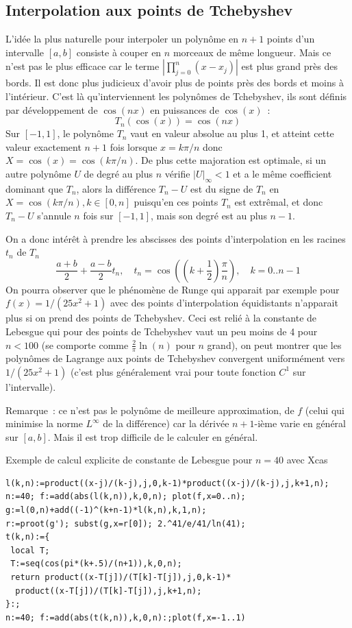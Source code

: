 \documentclass[a4paper,11pt]{article}
\begin{document}
\subsection{Interpolation aux points de Tchebyshev}
L'id\'ee la plus naturelle pour interpoler un polyn\^ome en $n+1$
points d'un intervalle $[a,b]$ consiste \`a couper en $n$ morceaux
de m\^eme longueur. Mais ce n'est pas le plus efficace car le
terme $|\prod_{j=0}^n(x-x_j)|$ est plus grand pr\`es des bords. Il est
donc plus judicieux d'avoir plus de points pr\`es des bords et moins
\`a l'int\'erieur. C'est l\`a qu'interviennent les polyn\^omes de
Tchebyshev, ils sont d\'efinis par d\'eveloppement de $\cos(nx)$
en puissances de $\cos(x)$~:
$$ T_n(\cos(x))=\cos(nx) $$
Sur $[-1,1]$, le polyn\^ome $T_n$ vaut en valeur absolue au plus 1, et
atteint cette valeur exactement $n+1$ fois lorsque $x=k\pi/n$ donc 
$X=\cos(x)=\cos(k\pi/n)$. De plus cette majoration est optimale,
si un autre polyn\^ome $U$ de degr\'e au plus $n$ 
v\'erifie $|U|_\infty<1$ et a le m\^eme coefficient dominant que
$T_n$, alors la diff\'erence $T_n-U$ est du signe de $T_n$ en
$X=\cos(k\pi/n), k \in [0,n]$ puisqu'en ces points $T_n$ est
extr\^emal, et donc $T_n-U$ s'annule $n$ fois sur $[-1,1]$, mais son degr\'e
est au plus $n-1$.

On a donc int\'er\^et \`a prendre les abscisses des points
d'interpolation en les racines $t_n$ de $T_n$
$$ \frac{a+b}{2} + \frac{a-b}{2} t_n, \quad t_n=\cos((k+\frac12)\frac\pi n), 
\quad k=0..n-1$$
On pourra observer que le ph\'enom\`ene de Runge qui apparait par
exemple pour $f(x)=1/(25x^2+1)$ avec des points d'interpolation
\'equidistants n'apparait plus si on prend des points de Tchebyshev.
Ceci est reli\'e \`a la constante de Lebesgue 
qui pour des points de Tchebyshev vaut un peu moins de 4 pour $n<100$
(se comporte comme $\frac2\pi \ln(n)$ pour $n$ grand), on peut montrer
que les polyn\^omes de Lagrange aux points de Tchebyshev convergent
uniform\'ement vers $1/(25x^2+1)$ (c'est plus g\'en\'eralement
vrai pour toute fonction $C^1$ sur l'intervalle).

Remarque~: ce n'est pas le polyn\^ome de meilleure approximation,
de $f$ (celui qui minimise la norme $L^\infty$ de la diff\'erence)
car la d\'eriv\'ee $n+1$-i\`eme varie en g\'en\'eral sur $[a,b]$. Mais
il est trop difficile de le calculer en g\'en\'eral.

Exemple de calcul explicite de constante de Lebesgue pour $n=40$ avec Xcas
\begin{verbatim}
l(k,n):=product((x-j)/(k-j),j,0,k-1)*product((x-j)/(k-j),j,k+1,n);
n:=40; f:=add(abs(l(k,n)),k,0,n); plot(f,x=0..n);
g:=l(0,n)+add((-1)^(k+n-1)*l(k,n),k,1,n);
r:=proot(g'); subst(g,x=r[0]); 2.^41/e/41/ln(41);
t(k,n):={ 
 local T; 
 T:=seq(cos(pi*(k+.5)/(n+1)),k,0,n);
 return product((x-T[j])/(T[k]-T[j]),j,0,k-1)*
  product((x-T[j])/(T[k]-T[j]),j,k+1,n);
}:;
n:=40; f:=add(abs(t(k,n)),k,0,n):;plot(f,x=-1..1)
\end{verbatim}
\end{document}
